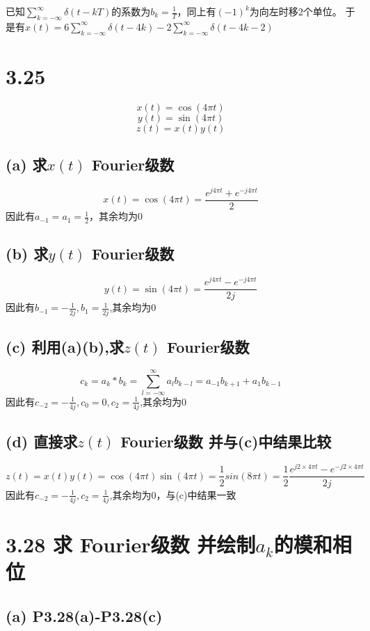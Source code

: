\documentclass[UTF8,fontset=fandol,12pt,a4paper]{ctexart}
\begin{document}
\noindent 已知$\sum_{k=-\infty}^{\infty}\delta(t-kT)$的系数为$b_k=\frac{1}{T}$，同上有${(-1)}^k$为向左时移2个单位。
于是有$x(t)=6\sum_{k=-\infty}^{\infty}\delta(t-4k)-2\sum_{k=-\infty}^{\infty}\delta(t-4k-2)$

\section*{3.25}

$$x(t)=\cos{(4\pi t)}$$
$$y(t)=\sin{(4\pi t)}$$
$$z(t)=x(t)y(t)$$

\subsection*{(a) 求$x(t)$ Fourier级数}

$$x(t)=\cos{(4\pi t)}=\frac{e^{j4\pi t}+e^{-j4\pi t}}{2}$$
因此有$a_{-1}=a_1=\frac{1}{2}$，其余均为0

\subsection*{(b) 求$y(t)$ Fourier级数}

$$y(t)=\sin{(4\pi t)}=\frac{e^{j4\pi t}-e^{-j4\pi t}}{2j}$$
因此有$b_{-1}=-\frac{1}{2j},b_1=\frac{1}{2j}$,其余均为0

\subsection*{(c) 利用(a)(b),求$z(t)$ Fourier级数}

$$c_k=a_k*b_k=\sum_{l=-\infty}^{\infty}a_lb_{k-l}=a_{-1}b_{k+1}+a_1b_{k-1}$$
因此有$c_{-2}=-\frac{1}{4j},c_0=0,c_2=\frac{1}{4j}$,其余均为0

\subsection*{(d) 直接求$z(t)$ Fourier级数 并与(c)中结果比较}

$$z(t)=x(t)y(t)=\cos{(4\pi t)}\sin{(4\pi t)}=\frac{1}{2}sin{(8\pi t)}=\frac{1}{2}\frac{e^{j2\times 4\pi t}-e^{-j2\times 4\pi t}}{2j}$$
因此有$c_{-2}=-\frac{1}{4j},c_2=\frac{1}{4j}$,其余均为0，与(c)中结果一致

\section*{3.28 求 Fourier级数 并绘制$a_k$的模和相位}

\subsection*{(a) P3.28(a)-P3.28(c)}
\end{document}
